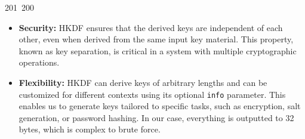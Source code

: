 201~200~\documentclass{article}
\begin{document}
	                                                                                                                                                                                                                                                                                                	                                                                                                                                        	    	                                                                                                	                                                                                                                                                                                                                                                            \begin{itemize}
	                                                                                                                                                                                                                                                                                                	                                                                                                                                        	    	                                                                                                	                                                                                                                                                                                                                                                                \item \textbf{Security:} HKDF ensures that the derived keys are independent of each other, even when derived from the same input key material. This property, known as key separation, is critical in a system with multiple cryptographic operations.
	                                                                                                                                                                                                                                                                                                	                                                                                                                                        	    	                                                                                                	                                                                                                                                                                                                                                                                    \item \textbf{Flexibility:} HKDF can derive keys of arbitrary lengths and can be customized for different contexts using its optional \texttt{info} parameter. This enables us to generate keys tailored to specific tasks, such as encryption, salt generation, or password hashing. In our case, everything is outputted to 32 bytes, which is complex to brute force.

\end{itemize}
\end{document}

